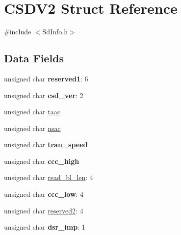 \hypertarget{struct_c_s_d_v2}{\section{C\-S\-D\-V2 Struct Reference}
\label{struct_c_s_d_v2}
}


{\ttfamily \#include $<$Sd\-Info.\-h$>$}

\subsection*{Data Fields}
\begin{DoxyCompactItemize}
\item 
\hypertarget{struct_c_s_d_v2_affe215a7220b2d52fb9dacf3b35e56dc}{unsigned char {\bfseries reserved1}\-: 6}\label{struct_c_s_d_v2_affe215a7220b2d52fb9dacf3b35e56dc}

\item 
\hypertarget{struct_c_s_d_v2_a468f68d66a14a0e3d70ae9dce7c7b084}{unsigned char {\bfseries csd\-\_\-ver}\-: 2}\label{struct_c_s_d_v2_a468f68d66a14a0e3d70ae9dce7c7b084}

\item 
unsigned char \hyperlink{struct_c_s_d_v2_add15a5302761bd6e2ee294c0c38e9f8a}{taac}
\item 
unsigned char \hyperlink{struct_c_s_d_v2_a877524d1f9ede3c07079957826d08a1e}{nsac}
\item 
\hypertarget{struct_c_s_d_v2_af83be4d825b2e325d094297e81693443}{unsigned char {\bfseries tran\-\_\-speed}}\label{struct_c_s_d_v2_af83be4d825b2e325d094297e81693443}

\item 
\hypertarget{struct_c_s_d_v2_a76b00b1b0657aefa115a98f122aca8c5}{unsigned char {\bfseries ccc\-\_\-high}}\label{struct_c_s_d_v2_a76b00b1b0657aefa115a98f122aca8c5}

\item 
unsigned char \hyperlink{struct_c_s_d_v2_af43ab7cd256a4134cd3b78bdecb9d7c5}{read\-\_\-bl\-\_\-len}\-: 4
\item 
\hypertarget{struct_c_s_d_v2_ad38ba451d9647c41a9b60a2f7a61e9d4}{unsigned char {\bfseries ccc\-\_\-low}\-: 4}\label{struct_c_s_d_v2_ad38ba451d9647c41a9b60a2f7a61e9d4}

\item 
unsigned char \hyperlink{struct_c_s_d_v2_add22350e7fe29ca6649dd6564e8425ea}{reserved2}\-: 4
\item 
\hypertarget{struct_c_s_d_v2_adca766448ce5830490363d3fbb02ab4b}{unsigned char {\bfseries dsr\-\_\-imp}\-: 1}\label{struct_c_s_d_v2_adca766448ce5830490363d3fbb02ab4b}


\end{DoxyCompactItemize}
